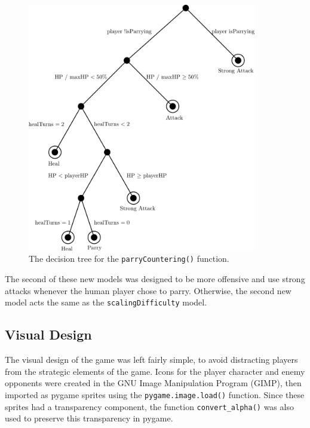 \begin{figure}[H]
  \centering
  \includegraphics[width=10cm]{figures/AIParry.png}
  \caption{The decision tree for the \texttt{parryCountering()} function.}
  \label{fig:AI8}
\end{figure}
The second of these new models was designed to be more offensive and use strong attacks whenever the human player chose to parry. Otherwise, the second new model acts the same as the \texttt{scalingDifficulty} model.\\

\subsection{Visual Design}
The visual design of the game was left fairly simple, to avoid distracting players from the strategic elements of the game. Icons for the player character and enemy opponents were created in the GNU Image Manipulation Program (GIMP), then imported as pygame sprites using the \texttt{pygame.image.load()} function. Since these sprites had a transparency component, the function \texttt{convert\_alpha()} was also used to preserve this transparency in pygame.\\


